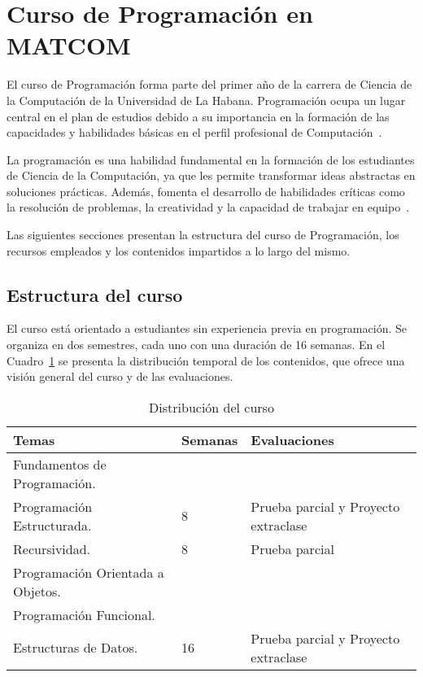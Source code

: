 \documentclass{article}
\begin{document}
\section{Curso de Programación en \mbox{MATCOM}}\label{sec:matcom}

El curso de Programación forma parte del primer año de la carrera de Ciencia de la Computación de la Universidad de La Habana. Programación ocupa un lugar central en el plan de estudios debido a su importancia en la formación de las capacidades y habilidades básicas en el perfil profesional de Computación~\cite{plan_estudio_e_2017}.

La programación es una habilidad fundamental en la formación de los estudiantes de Ciencia de la Computación, ya que les permite transformar ideas abstractas en soluciones prácticas. Además, fomenta el desarrollo de habilidades críticas como la resolución de problemas, la creatividad y la capacidad de trabajar en equipo~\cite{plan_estudio_e_2017}.

Las siguientes secciones presentan la estructura del curso de Programación, los recursos empleados y los contenidos impartidos a lo largo del mismo.

\subsection{Estructura del curso}

El curso está orientado a estudiantes sin experiencia previa en programación. Se organiza en dos semestres, cada uno con una duración de 16 semanas. En el Cuadro~\ref{tab:course_distribution} se presenta la distribución temporal de los contenidos, que ofrece una visión general del curso y de las evaluaciones.

\begin{table}[h!]
    \centering
    \begin{tabular}{|p{5cm}|p{2cm}|p{3cm}|}
    \hline
    \textbf{Temas} & \textbf{Semanas} & \textbf{Evaluaciones} \\ \hline
    \raggedright Fundamentos de Programación. \\ Programación Estructurada. 
    & 8 & Prueba parcial y Proyecto extraclase \\ \hline
    \raggedright Recursividad.
    & 8 & Prueba parcial \\ \hline
    \raggedright Programación Orientada a Objetos. \\ Programación Funcional. \\ Estructuras de Datos. 
    & 16 & Prueba parcial y Proyecto extraclase \\ \hline
    \end{tabular}
    \caption{Distribución del curso}\label{tab:course_distribution}
\end{table}
    
\end{document}
